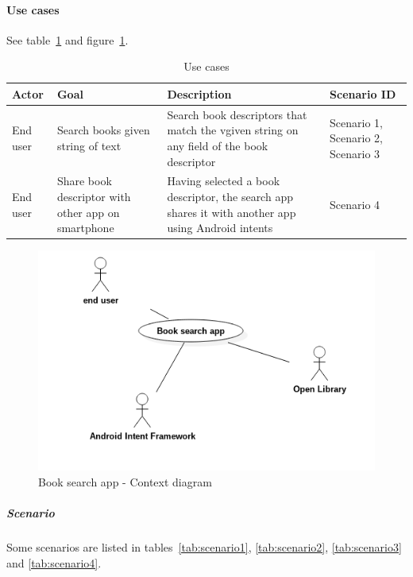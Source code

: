 \paragraph{Use cases}
See table~\ref{tab:book_usecases} and figure~\ref{img:book_context}.
\begin{table}
\begin{tabularx}{\textwidth}{|l|X|X|X|}
\hline
\textbf{Actor} & \textbf{Goal} & \textbf{Description} & \textbf{Scenario ID} \\
\hline
End user & Search books given string of text & Search book descriptors that match the vgiven string on any field of the book descriptor & Scenario 1, Scenario 2, Scenario 3 \\
\hline
End user & Share book descriptor with other app on smartphone & Having selected a book descriptor, the search app shares it with another app using Android intents & Scenario 4 \\
\hline
\end{tabularx}
\caption{Use cases}
\label{tab:book_usecases}
\end{table}

\begin{figure}[hbtp]
\centering
\includegraphics[scale=0.45]{exercises/book_contextDiagram.png}
\caption{Book search app - Context diagram}
\label{img:book_context}
\end{figure}

\subparagraph{Scenario}
Some scenarios are listed in tables~\ref{tab:scenario1}, \ref{tab:scenario2}, \ref{tab:scenario3} and \ref{tab:scenario4}.

